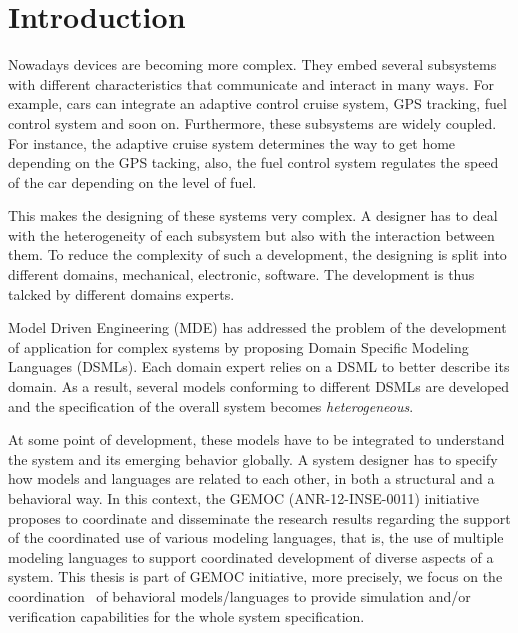 \chapter{Introduction}	
Nowadays devices are becoming more complex. They embed several subsystems with different characteristics that communicate and interact in many ways. For example, cars can integrate an adaptive control cruise system, GPS tracking, fuel control system and soon on. Furthermore, these subsystems are widely coupled. For instance, the adaptive cruise system determines the way to get home depending on the GPS tacking, also, the fuel control system regulates the speed of the car depending on the level of fuel.
	
This makes the designing of these systems very complex. A designer has to deal with the heterogeneity of each subsystem but also with the interaction between them. To reduce the complexity of such a development, the designing is split into different domains, \eg mechanical, electronic, software. The development is thus talcked by different domains experts.
	
Model Driven Engineering (MDE) has addressed the problem of the development of application for complex systems by proposing Domain Specific Modeling Languages (DSMLs). Each domain expert relies on a DSML to better describe its domain. As a result, several models conforming to different DSMLs are developed and the specification of the overall system becomes \emph{heterogeneous}.




At some point of development, these models have to be integrated to understand the system and its emerging behavior globally. A system designer has to specify how models and languages are related to each other, in both a structural and a behavioral way. In this context, the GEMOC (ANR-12-INSE-0011) initiative proposes to coordinate and disseminate the research results regarding the support of the coordinated use of various modeling languages, that is, the use of multiple modeling languages to support coordinated development of diverse aspects of a system. This thesis is part of GEMOC initiative, more precisely, we focus on the coordination~\cite{coordsignibib} of behavioral models/languages to provide simulation and/or verification capabilities for the whole system specification. 
	
